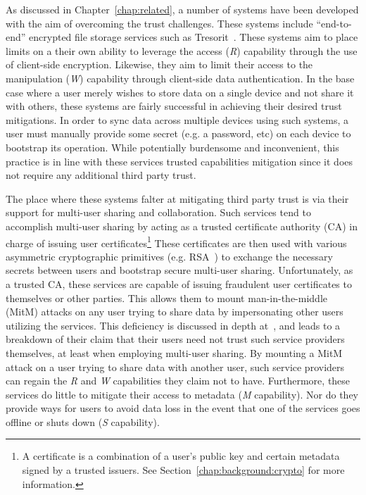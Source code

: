 As discussed in Chapter~\ref{chap:related}, a number of systems have
been developed with the aim of overcoming the trust challenges. These
systems include ``end-to-end'' encrypted file storage services such as
Tresorit~\cite{tresorit}. These systems aim to place limits on a their
own ability to leverage the access (\emph{R}) capability through the
use of client-side encryption. Likewise, they aim to limit their
access to the manipulation (\emph{W}) capability through client-side
data authentication. In the base case where a user merely wishes to
store data on a single device and not share it with others, these
systems are fairly successful in achieving their desired trust
mitigations. In order to sync data across multiple devices using such
systems, a user must manually provide some secret (e.g. a password,
etc) on each device to bootstrap its operation. While potentially
burdensome and inconvenient, this practice is in line with these
services trusted capabilities mitigation since it does not require any
additional third party trust.

The place where these systems falter at mitigating third party trust
is via their support for multi-user sharing and collaboration. Such
services tend to accomplish multi-user sharing by acting as a trusted
certificate authority (CA) in charge of issuing user
certificates\footnote{A certificate is a combination of a user's
  public key and certain metadata signed by a trusted issuers. See
  Section~\ref{chap:background:crypto} for more information.} These
certificates are then used with various asymmetric cryptographic
primitives (e.g. RSA~\cite{rivest1978}) to exchange the necessary
secrets between users and bootstrap secure multi-user
sharing. Unfortunately, as a trusted CA, these services are capable of
issuing fraudulent user certificates to themselves or other
parties. This allows them to mount man-in-the-middle (MitM) attacks on
any user trying to share data by impersonating other users utilizing
the services. This deficiency is discussed in depth
at~\cite{wilson2014}, and leads to a breakdown of their claim that
their users need not trust such service providers themselves, at least
when employing multi-user sharing. By mounting a MitM attack on a user
trying to share data with another user, such service providers can
regain the \emph{R} and \emph{W} capabilities they claim not to
have. Furthermore, these services do little to mitigate their access
to metadata (\emph{M} capability). Nor do they provide ways for users
to avoid data loss in the event that one of the services goes offline
or shuts down (\emph{S} capability).

